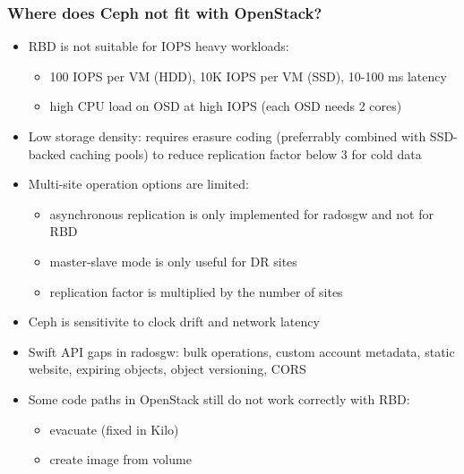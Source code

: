 \documentclass[hyperref=unicode,utf8,xcolor=pst,aspectratio=169]{beamer}
\begin{document}
\begin{frame}
	\frametitle{Where does Ceph not fit with OpenStack?}
	\begin{itemize}
		\item RBD is not suitable for {\color{mirantisred}IOPS heavy
			workloads}:
			\begin{itemize}
				\item 100 IOPS per VM (HDD),
					10K IOPS per VM (SSD),
					10-100 ms latency
				\item high CPU load on OSD at high IOPS
					(each OSD needs 2 cores)
			\end{itemize}
		\item Low {\color{mirantisred}storage density}: requires
			erasure coding (preferrably combined with SSD-backed
			caching pools) to reduce replication factor below 3 for
			cold data
		\item {\color{mirantisred}Multi-site operation} options are
			limited:
			\begin{itemize}
				\item asynchronous replication is only
					implemented for radosgw and not for
					RBD
				\item master-slave mode is only useful for DR
					sites
				\item replication factor is multiplied by the
					number of sites
			\end{itemize}
		\item Ceph is sensitivite to {\color{mirantisred}clock drift}
			and {\color{mirantisred}network latency}
		\item {\color{mirantisred}Swift API} gaps in radosgw: bulk
			operations, custom account metadata, static website,
			expiring objects, object versioning, CORS
		\item Some code paths in OpenStack still do not work correctly
			with RBD:
			\begin{itemize}
				\item evacuate (fixed in Kilo)
				\item create image from volume
			\end{itemize}
	\end{itemize}
\end{frame}
\end{document}
